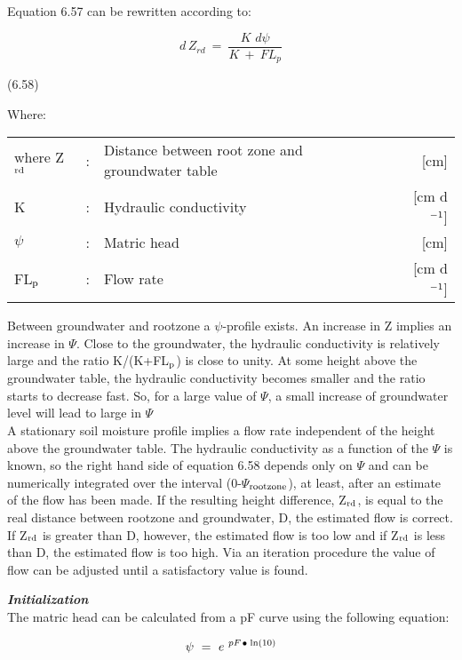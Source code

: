 Equation 6.57 can be rewritten according to:

\begin{equation}
d\, Z _{rd} ~=~{\frac{K\,\, d \psi }{ K ~+~ FL _{p} }}
\end{equation}

 
\strut\hfill (6.58)

Where:\\
\begin{tabularx}{\textwidth}{llXr}



where Z$_{{\rm rd}}$ &:& Distance between root zone and groundwater table  & [cm]\\
K &:& Hydraulic conductivity  & [cm d$^{{\rm -1}}$]\\
$\psi$ &:& Matric head  & [cm]\\
FL$_{{\rm p}}$ &:& Flow rate  & [cm d$^{{\rm -1}}$]
\end{tabularx}


Between groundwater and rootzone a $\psi$-profile exists. An increase in Z implies an
increase in $\Psi$. Close to the groundwater, the hydraulic conductivity is relatively large and
the ratio K/(K+FL$_{{\rm p}}$) is close to unity. At some height above the groundwater table, the
hydraulic conductivity becomes smaller and the ratio starts to decrease fast. So, for a
large value of $\Psi$, a small increase of groundwater level will lead to large in $\Psi$\\
A stationary soil moisture profile implies a flow rate independent of the height above the
groundwater table. The hydraulic conductivity as a function of the $\Psi$ is known, so the
right hand side of equation 6.58 depends only on $\Psi$ and can be numerically integrated
over the interval (0-$\Psi$$_{{\rm rootzone}}$), at least, after an estimate of the flow has been made. If the
resulting height difference, Z$_{{\rm rd}}$, is equal to the real distance between rootzone and
groundwater, D, the estimated flow is correct. If Z$_{{\rm rd}}$ is greater than D, however, the
estimated flow is too low and if Z$_{{\rm rd}}$ is less than D, the estimated flow is too high. Via an
iteration procedure the value of flow can be adjusted until a satisfactory value is found.






{\bf {\it Initialization\/}}\\
The matric head can be calculated from a pF curve using the following equation:

\begin{equation}
\psi ~=~e ^{~pF\, {\rm \Bullet{0.75ex}}\, \ln (10)} 
\end{equation}

